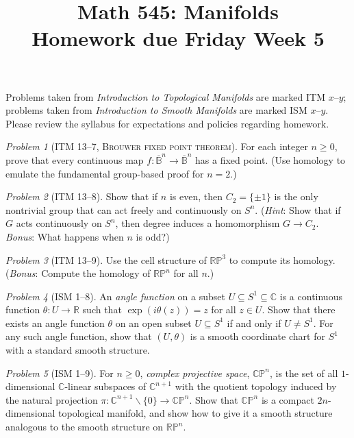 \documentclass[11pt,twoside]{amsart}
\title{Math 545: Manifolds\\ Homework due Friday Week 5}
\theoremstyle{plain}
\theoremstyle{remark}
\newtheorem{prob}{Problem}
\theoremstyle{definition}
\theoremstyle{definition}
\newcommand{\RR}{\mathbb{R}}
\newcommand{\CC}{\mathbb{C}}
\newcommand{\PP}{\mathbb{P}}
\begin{document}
\maketitle

\noindent Problems taken from \emph{Introduction to Topological Manifolds} are marked ITM $x$--$y$; problems taken from \emph{Introduction to Smooth Manifolds} are marked ISM $x$--$y$. Please review the syllabus for expectations and policies regarding homework.

\begin{prob}[ITM 13--7, \textsc{Brouwer fixed point theorem}]
For each integer $n\ge 0$, prove that every continuous map $f\colon \overline{\mathbb B}^n\to \overline{\mathbb{B}}^n$ has a fixed point. (Use homology to emulate the fundamental group-based proof for $n=2$.)
\end{prob}

\begin{prob}[ITM 13--8]
Show that if $n$ is even, then $C_2 = \{\pm 1\}$ is the only nontrivial group that can act freely and continuously on $S^n$. (\emph{Hint}: Show that if $G$ acts continuously on $S^n$, then degree induces a homomorphism $G\to C_2$. \emph{Bonus}: What happens when $n$ is odd?)
\end{prob}

\begin{prob}[ITM 13--9]
Use the cell structure of $\RR\PP^3$ to compute its homology. (\emph{Bonus}: Compute the homology of $\RR\PP^n$ for all $n$.)
\end{prob}

\begin{prob}[ISM 1--8]
An \emph{angle function} on a subset $U\subseteq S^1\subseteq \CC$ is a continuous function $\theta\colon U\to \RR$ such that $\exp(i\theta(z))=z$ for all $z\in U$. Show that there exists an angle function $\theta$ on an open subset $U\subseteq S^1$ if and only if $U\ne S^1$. For any such angle function, show that $(U,\theta)$ is a smooth coordinate chart for $S^1$ with a standard smooth structure.
\end{prob}

\begin{prob}[ISM 1--9]
For $n\ge 0$, \emph{complex projective space}, $\CC\PP^n$, is the set of all $1$-dimensional $\CC$-linear subspaces of $\CC^{n+1}$ with the quotient topology induced by the natural projection $\pi\colon \CC^{n+1}\smallsetminus \{0\}\to \CC\PP^n$. Show that $\CC\PP^n$ is a compact $2n$-dimensional topological manifold, and show how to give it a smooth structure analogous to the smooth structure on $\RR\PP^n$.
\end{prob}
\end{document}
